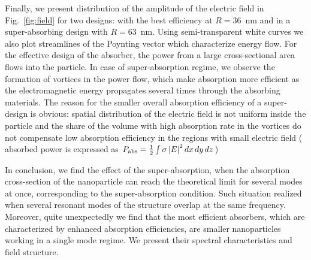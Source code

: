 \documentclass[aps,prl,twocolumn,showpacs,superscriptaddress,groupedaddress]{revtex4-1}
\begin{document}
\begin{figure}
\end{figure}
Finally, we present distribution of the amplitude of the electric
field in Fig.~\ref{fig:field} for two designs: with the best
efficiency at $R=36$~nm and in a super-absorbing design with
$R=63$~nm.  Using semi-transparent white curves we also plot
streamlines of the Poynting vector which characterize energy flow.
For the effective design of the absorber, the power from a large
cross-sectional area flows into the particle.  In case of
super-absorption regime, we observe the formation of vortices in the
power flow, which make absorption more efficient as the
electromagnetic energy propagates several times through the absorbing
materials.  The reason for the smaller overall absorption efficiency
of a super-design is obvious: spatial distribution of the electric
field is not uniform inside the particle and the share of the volume
with high absorption rate in the vortices do not compensate low
absorption efficiency in the regions with small electric field (
absorbed power is expressed as $P_{\rm abs}=\frac{1}{2}\int\sigma
\left|E\right|^2dx\,dy\,dz$)

In conclusion, we find the effect of the super-absorption, when the
absorption cross-section of the nanoparticle can reach the theoretical
limit for several modes at once, corresponding to the super-absorption
condition. Such situation realized when several resonant modes of the
structure overlap at the same frequency. Moreover, quite unexpectedly
we find that the most efficient absorbers, which are characterized by
enhanced absorption efficiencies, are smaller nanoparticles working in
a single mode regime. We present their spectral characteristics and
field structure.
\end{document}
